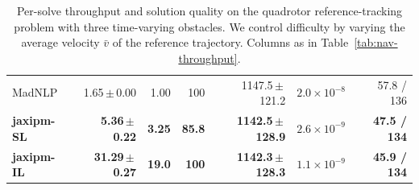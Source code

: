 \begin{table}[t]
{\begin{tabular}{@{}l r r r r r r@{}}
MadNLP & 1.65\,$\pm$\,0.00 & 1.00 & 100 & 1147.5\,$\pm$\,121.2 & $2.0\!\times\!10^{-8}$ & 57.8 / 136 \\
\textbf{jaxipm-SL} & \textbf{5.36\,$\pm$\,0.22} & \textbf{3.25} & \textbf{85.8} & \textbf{1142.5\,$\pm$\,128.9} & {\boldmath$2.6\!\times\!10^{-9}$} & \textbf{47.5 / 134} \\
\textbf{jaxipm-IL} & \textbf{31.29\,$\pm$\,0.27} & \textbf{19.0} & \textbf{100} & \textbf{1142.3\,$\pm$\,128.3} & {\boldmath$1.1\!\times\!10^{-9}$} & \textbf{45.9 / 134} \\
\bottomrule
\end{tabular}}
\caption{Per-solve throughput and solution quality on the quadrotor reference-tracking problem with three time-varying obstacles. We control difficulty by varying the average velocity $\bar{v}$ of the reference trajectory. Columns as in Table~\ref{tab:nav-throughput}.}
\label{tab:track-avoid-throughput}
\end{table}

